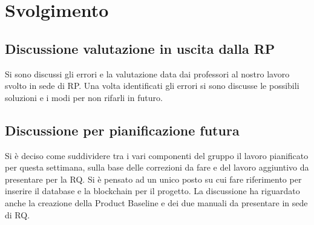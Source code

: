 \section*{Svolgimento}

\subsection*{Discussione valutazione in uscita dalla RP}
Si sono discussi gli errori e la valutazione data dai professori al nostro lavoro svolto in sede di RP. Una volta identificati gli errori si sono discusse le possibili soluzioni e i modi per non rifarli in futuro.
\subsection*{Discussione per pianificazione futura}
Si è deciso come suddividere tra i vari componenti del gruppo il lavoro pianificato per questa settimana, sulla base delle correzioni da fare e del lavoro aggiuntivo da presentare per la RQ.
Si è pensato ad un unico posto su cui fare riferimento per inserire il database e la blockchain per il progetto.
La discussione ha riguardato anche la creazione della Product Baseline e dei due manuali da presentare in sede di RQ.